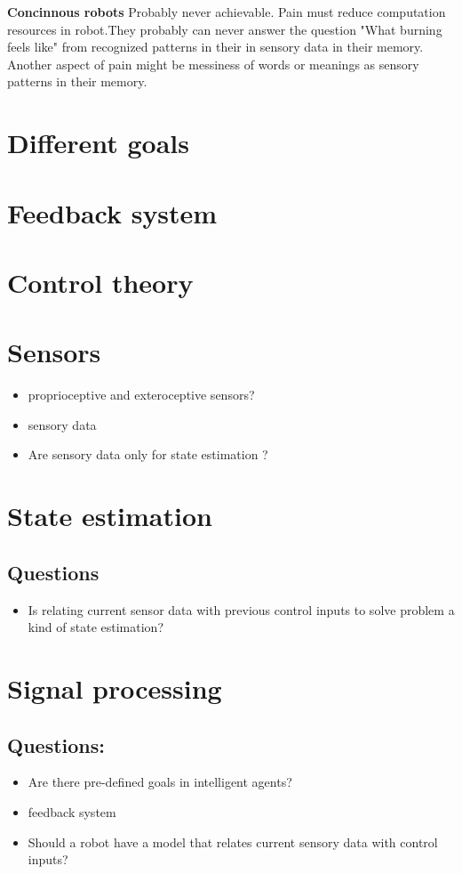         \textbf{Concinnous robots}
        Probably never achievable. Pain must reduce computation resources in robot.They probably can never answer the question "What burning feels like" from recognized patterns in their in sensory data in their memory. Another aspect of pain might be messiness of words or meanings as sensory patterns in their memory. 



\section{Different goals}
\section{Feedback system}

\section{Control theory}

\section{Sensors}
\begin{itemize}
    \item proprioceptive and exteroceptive sensors?
    \item sensory data
    \item Are sensory data only for state estimation ?
\end{itemize}
\section{State estimation}
\subsection{Questions}
\begin{itemize}
    \item Is relating current sensor data with previous control inputs to solve problem a kind of state estimation?
\end{itemize}
\section{Signal processing}
\subsection{Questions:}
\begin{itemize}
    \item Are there pre-defined goals in intelligent agents?
    \item feedback system
    \item Should a robot have a model that relates current sensory data with control inputs?
\end{itemize}